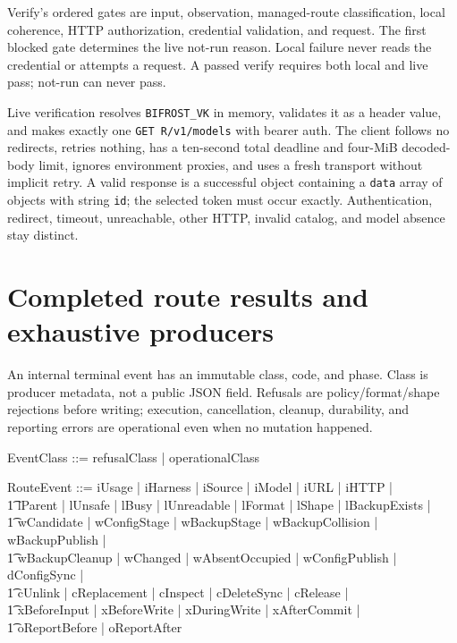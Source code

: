 \documentclass{article}
\begin{document}
Verify's ordered gates are input, observation, managed-route classification,
local coherence, HTTP authorization, credential validation, and request.  The
first blocked gate determines the live not-run reason.  Local failure never
reads the credential or attempts a request.  A passed verify requires both
local and live pass; not-run can never pass.

Live verification resolves \texttt{BIFROST\_VK} in memory, validates it as a
header value, and makes exactly one \texttt{GET R/v1/models} with bearer auth.
The client follows no redirects, retries nothing, has a ten-second total
deadline and four-MiB decoded-body limit, ignores environment proxies, and uses
a fresh transport without implicit retry.  A valid response is a successful
object containing a \texttt{data} array of objects with string \texttt{id}; the
selected token must occur exactly.  Authentication, redirect, timeout,
unreachable, other HTTP, invalid catalog, and model absence stay distinct.

\section{Completed route results and exhaustive producers}

An internal terminal event has an immutable class, code, and phase.  Class is
producer metadata, not a public JSON field.  Refusals are policy/format/shape
rejections before writing; execution, cancellation, cleanup, durability, and
reporting errors are operational even when no mutation happened.

\begin{zed}
	EventClass ::= refusalClass | operationalClass
\end{zed}

\begin{zed}
	RouteEvent ::= iUsage | iHarness | iSource | iModel | iURL | iHTTP | \\
	\t1 lParent | lUnsafe | lBusy | lUnreadable | lFormat | lShape | lBackupExists | \\
	\t1 wCandidate | wConfigStage | wBackupStage | wBackupCollision | wBackupPublish | \\
	\t1 wBackupCleanup | wChanged | wAbsentOccupied | wConfigPublish | dConfigSync | \\
	\t1 cUnlink | cReplacement | cInspect | cDeleteSync | cRelease | \\
	\t1 xBeforeInput | xBeforeWrite | xDuringWrite | xAfterCommit | \\
	\t1 oReportBefore | oReportAfter
\end{zed}
\end{document}
